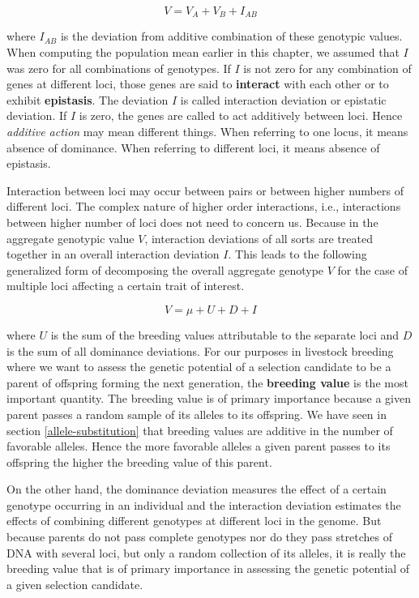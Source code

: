 \documentclass[]{book}
\theoremstyle{definition}
\theoremstyle{definition}
\theoremstyle{definition}
\theoremstyle{remark}
\begin{document}
\begin{equation}
V = V_A + V_B + I_{AB}
\label{eq:AggregateGenotypicValueTwoLoci}
\end{equation}

where \(I_{AB}\) is the deviation from additive combination of these genotypic values. When computing the population mean earlier in this chapter, we assumed that \(I\) was zero for all combinations of genotypes. If \(I\) is not zero for any combination of genes at different loci, those genes are said to \textbf{interact} with each other or to exhibit \textbf{epistasis}. The deviation \(I\) is called interaction deviation or epistatic deviation. If \(I\) is zero, the genes are called to act additively between loci. Hence \emph{additive action} may mean different things. When referring to one locus, it means absence of dominance. When referring to different loci, it means absence of epistasis.

Interaction between loci may occur between pairs or between higher numbers of different loci. The complex nature of higher order interactions, i.e., interactions between higher number of loci does not need to concern us. Because in the aggregate genotypic value \(V\), interaction deviations of all sorts are treated together in an overall interaction deviation \(I\). This leads to the following generalized form of decomposing the overall aggregate genotype \(V\) for the case of multiple loci affecting a certain trait of interest.

\begin{equation}
V = \mu + U + D + I
\label{eq:AggregateGenotypicValueMultipleLoci}
\end{equation}

where \(U\) is the sum of the breeding values attributable to the separate loci and \(D\) is the sum of all dominance deviations. For our purposes in livestock breeding where we want to assess the genetic potential of a selection candidate to be a parent of offspring forming the next generation, the \textbf{breeding value} is the most important quantity. The breeding value is of primary importance because a given parent passes a random sample of its alleles to its offspring. We have seen in section \ref{allele-substitution} that breeding values are additive in the number of favorable alleles. Hence the more favorable alleles a given parent passes to its offspring the higher the breeding value of this parent.

On the other hand, the dominance deviation measures the effect of a certain genotype occurring in an individual and the interaction deviation estimates the effects of combining different genotypes at different loci in the genome. But because parents do not pass complete genotypes nor do they pass stretches of DNA with several loci, but only a random collection of its alleles, it is really the breeding value that is of primary importance in assessing the genetic potential of a given selection candidate.
\end{document}
